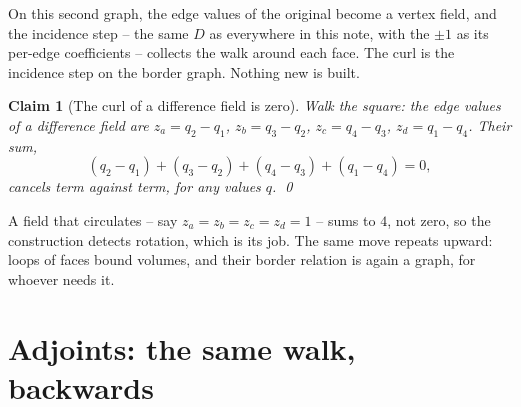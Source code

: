 \documentclass[11pt]{article}
\newtheorem{claim}{Claim}
\begin{document}
\begin{center}
\end{center}

\noindent
On this second graph, the edge values of the original become a vertex
field, and the incidence step -- the same $D$ as everywhere in this note,
with the $\pm 1$ as its per-edge coefficients -- collects the walk
around each face. The curl is the incidence step on the border graph.
Nothing new is built.

\begin{claim}[The curl of a difference field is zero]
Walk the square: the edge values of a difference field are
$z_a = q_2 - q_1$, $z_b = q_3 - q_2$, $z_c = q_4 - q_3$,
$z_d = q_1 - q_4$. Their sum,
\[
(q_2 - q_1) + (q_3 - q_2) + (q_4 - q_3) + (q_1 - q_4) = 0,
\]
cancels term against term, for any values $q$. \qed
\end{claim}

A field that circulates -- say $z_a = z_b = z_c = z_d = 1$ -- sums to
$4$, not zero, so the construction detects rotation, which is its
job. The same move repeats upward: loops of faces bound volumes, and
their border relation is again a graph, for whoever needs it.

\section{Adjoints: the same walk, backwards}\label{sec:adjoints}
\end{document}
